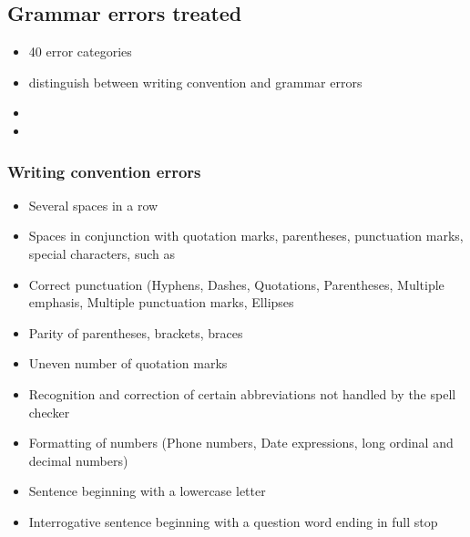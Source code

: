 \documentclass[a4paper,english,12pt]{article}
\begin{document}
\begin{spacing}{1.0}
\subsection{Grammar errors treated}


\begin{itemize}
\item 40 error categories
\item distinguish between writing convention and grammar errors
\item 
\item 
\end{itemize}

\subsubsection{Writing convention errors}
\begin{itemize}
    \item Several spaces in a row
    \item Spaces in conjunction with quotation marks, parentheses, punctuation marks, special characters, such as %
	\item Correct punctuation (Hyphens, Dashes, Quotations, Parentheses, Multiple emphasis, Multiple punctuation marks, Ellipses 
	\item Parity of parentheses, brackets, braces
    \item Uneven number of quotation marks 
    \item Recognition and correction of certain abbreviations not handled by the spell checker
    \item Formatting of numbers (Phone numbers, Date expressions, long ordinal and decimal numbers)
    \item Sentence beginning with a lowercase letter
    \item Interrogative sentence beginning with a question word ending in full stop 
\end{itemize}


\end{spacing}
\end{document}
